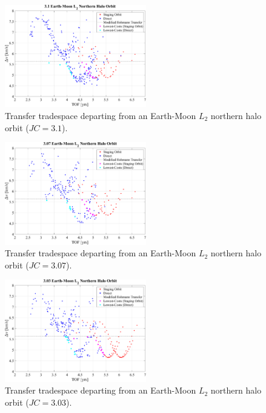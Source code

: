 \begin{figure}[ht]
    \centering
    \includegraphics[width=0.55\textwidth]{figures/TradeSpace_L2Halo_3_10.pdf}
    \caption{Transfer tradespace departing from an Earth-Moon $L_{2}$ northern halo orbit ($JC=3.1$).}
\end{figure}

\begin{figure}[ht]
    \centering
    \includegraphics[width=0.55\textwidth]{figures/TradeSpace_L2Halo_3_07.pdf}
    \caption{Transfer tradespace departing from an Earth-Moon $L_{2}$ northern halo orbit ($JC=3.07$).}
\end{figure}

\begin{figure}[ht]
    \centering
    \includegraphics[width=0.55\textwidth]{figures/TradeSpace_L2Halo_3_03.pdf}
    \caption{Transfer tradespace departing from an Earth-Moon $L_{2}$ northern halo orbit ($JC=3.03$).}
\end{figure}
\clearpage

